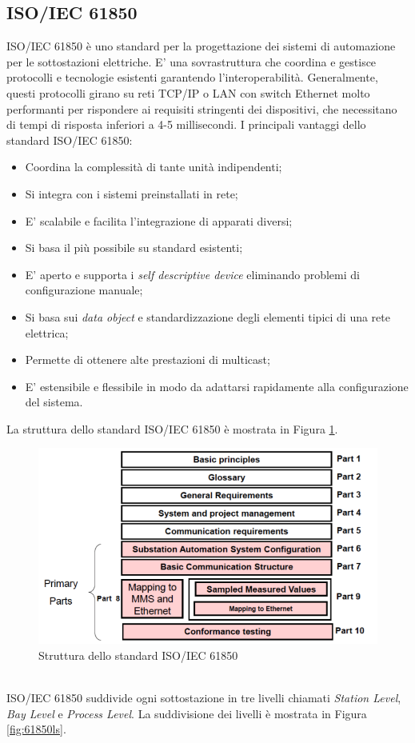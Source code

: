 \subsection{ISO/IEC 61850 \label{sec:IEC61850}}
ISO/IEC 61850 è uno standard per la progettazione dei sistemi di automazione per le sottostazioni elettriche. E' una sovrastruttura che coordina e gestisce protocolli e tecnologie esistenti garantendo l'interoperabilità. Generalmente, questi protocolli girano su reti TCP/IP o LAN con switch Ethernet molto performanti per rispondere ai requisiti stringenti dei dispositivi, che necessitano di tempi di risposta inferiori a 4-5 millisecondi.\newline\newline
I principali vantaggi dello standard ISO/IEC 61850:
\begin{itemize}
	\item Coordina la complessità di tante unità indipendenti;
	\item Si integra con i sistemi preinstallati in rete;
	\item E' scalabile e facilita l'integrazione di apparati diversi;
	\item Si basa il più possibile su standard esistenti;
	\item E' aperto e supporta i \emph{self descriptive device} eliminando problemi di configurazione manuale;
	\item Si basa sui \emph{data object} e standardizzazione degli elementi tipici di una rete elettrica;
	\item Permette di ottenere alte prestazioni di multicast;
	\item E' estensibile e flessibile in modo da adattarsi rapidamente alla configurazione del sistema.
\end{itemize}
\newpage
La struttura dello standard ISO/IEC 61850\cite{iec61850} è mostrata in Figura \ref{fig:iec61850}.
\begin{figure}[h]
	\centering
	\includegraphics[scale=0.400]{imgs/iec61850.png}
	\caption{Struttura dello standard ISO/IEC 61850} \label{fig:iec61850}
\end{figure}\\
ISO/IEC 61850 suddivide ogni sottostazione in tre livelli\cite{iec61850} chiamati \emph{Station Level}, \emph{Bay Level} e \emph{Process Level}. La suddivisione dei livelli è mostrata in Figura \ref{fig:61850ls}.

